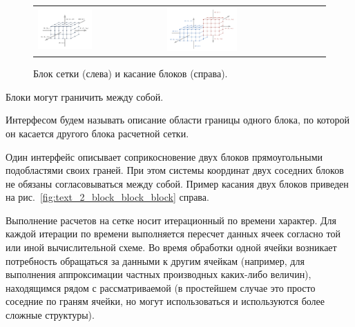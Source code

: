 \begin{figure}[ht]
\centering
\begin{tabular}{ll}
\includegraphics[width=0.45\textwidth]{./pics/text_2_block/1-block.pdf}
&
\includegraphics[width=0.45\textwidth]{./pics/text_2_block/2-block-block.pdf}
\end{tabular}
\singlespacing
{}\caption{Блок сетки (слева) и касание блоков (справа).}
\label{fig:text_2_block_block}
\end{figure}

Блоки могут граничить между собой.

\begin{definition}
Интерфесом\label{term:block_interface} будем называть описание области границы одного блока, по которой он касается другого блока расчетной сетки.
\end{definition}

Один интерфейс описывает соприкосновение двух блоков прямоугольными подобластями своих граней.
При этом системы координат двух соседних блоков не обязаны согласовываться между собой.
Пример касания двух блоков приведен на рис.~\ref{fig:text_2_block_block_block} справа.

Выполнение расчетов на сетке носит итерационный по времени характер.
Для каждой итерации по времени выполняется пересчет данных ячеек согласно той или иной вычислительной схеме.
Во время обработки одной ячейки возникает потребность обращаться за данными к другим ячейкам (например, для выполнения аппроксимации частных производных каких-либо величин), находящимся рядом с рассматриваемой (в простейшем случае это просто соседние по граням ячейки, но могут использоваться и используются более сложные структуры).

